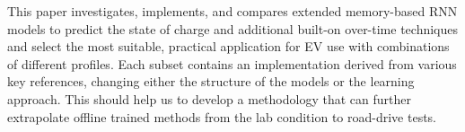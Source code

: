 %
%
%
%
%
 {
    This paper investigates, implements, and compares extended memory-based RNN models to predict the state of charge and additional built-on over-time techniques and select the most suitable, practical application for EV use with combinations of different profiles.
}
Each subset contains an implementation derived from various key references, changing either the structure of the models or the learning approach.
This should help us to develop a methodology that can further extrapolate offline trained methods from the lab condition to road-drive tests.
